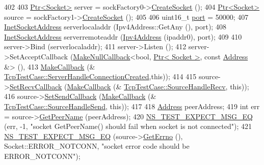 \begin{DoxyCode}
402 
403   \hyperlink{classns3_1_1Ptr}{Ptr<Socket>} server = sockFactory0->\hyperlink{classns3_1_1SocketFactory_a97351e6e7860503a4912042530449f62}{CreateSocket} ();
404   \hyperlink{classns3_1_1Ptr}{Ptr<Socket>} source = sockFactory1->\hyperlink{classns3_1_1Socket_ad448a62bb50ad3dbac59c879a885a8d2}{CreateSocket} ();
405 
406   uint16\_t \hyperlink{dsdv-manet_8cc_a8e0798404bf2cf5dabb84c5ba9a4f236}{port} = 50000;
407   \hyperlink{classns3_1_1InetSocketAddress}{InetSocketAddress} serverlocaladdr (Ipv4Address::GetAny (), port);
408   \hyperlink{classns3_1_1InetSocketAddress}{InetSocketAddress} serverremoteaddr (\hyperlink{classns3_1_1Ipv4Address}{Ipv4Address} (ipaddr0), port);
409 
410   server->Bind (serverlocaladdr);
411   server->Listen ();
412   server->SetAcceptCallback (\hyperlink{group__makenullcallback_ga7e3cd6816f63ea9112c04b0086c2c65a}{MakeNullCallback}<\textcolor{keywordtype}{bool}, 
      \hyperlink{classns3_1_1Ptr}{Ptr< Socket >}, \textcolor{keyword}{const} \hyperlink{classns3_1_1Address}{Address} &> (),
413                              \hyperlink{group__makecallbackmemptr_ga9376283685aa99d204048d6a4b7610a4}{MakeCallback} (&
      \hyperlink{classTcpTestCase_a92ee004cc017259628ac1731ca4e040a}{TcpTestCase::ServerHandleConnectionCreated},\textcolor{keyword}{this}));
414 
415   source->\hyperlink{classns3_1_1Socket_a243f7835ef1a85f9270fd3577e3a40da}{SetRecvCallback} (\hyperlink{group__makecallbackmemptr_ga9376283685aa99d204048d6a4b7610a4}{MakeCallback} (&
      \hyperlink{classTcpTestCase_a924eda25940bdd641e431408eb750a24}{TcpTestCase::SourceHandleRecv}, \textcolor{keyword}{this}));
416   source->\hyperlink{classns3_1_1Socket_a85ff5c8cc7d242823f301b49264c68a4}{SetSendCallback} (\hyperlink{group__makecallbackmemptr_ga9376283685aa99d204048d6a4b7610a4}{MakeCallback} (&
      \hyperlink{classTcpTestCase_ae2b2672883a732447f02e4bf82840f34}{TcpTestCase::SourceHandleSend}, \textcolor{keyword}{this}));
417 
418   \hyperlink{classns3_1_1Address}{Address} peerAddress;
419   \textcolor{keywordtype}{int} err = source->\hyperlink{classns3_1_1Socket_a78a3c37a539d2e70869bb82cc60fbb09}{GetPeerName} (peerAddress);
420   \hyperlink{group__testing_ga7304ba46a28d8cf08dfdfd6499cf7068}{NS\_TEST\_EXPECT\_MSG\_EQ} (err, -1, \textcolor{stringliteral}{"socket GetPeerName() should fail when socket is not
       connected"});
421   \hyperlink{group__testing_ga7304ba46a28d8cf08dfdfd6499cf7068}{NS\_TEST\_EXPECT\_MSG\_EQ} (source->\hyperlink{classns3_1_1Socket_ae489616249d946f3c0dc831c05d0d711}{GetErrno} (), Socket::ERROR\_NOTCONN, \textcolor{stringliteral}{"socket
       error code should be ERROR\_NOTCONN"});

\end{DoxyCode}
